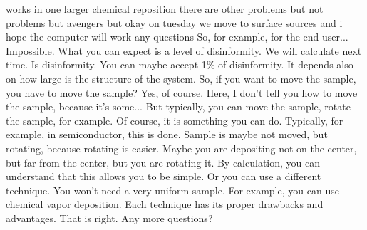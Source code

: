 works in one larger chemical reposition there are other problems but not problems but avengers but okay on tuesday we move to surface sources and i hope the computer will work any questions So, for example, for the end-user... Impossible. What you can expect is a level of disinformity. We will calculate next time. Is disinformity. You can maybe accept 1\% of disinformity. It depends also on how large is the structure of the system. So, if you want to move the sample, you have to move the sample? Yes, of course. Here, I don't tell you how to move the sample, because it's some... But typically, you can move the sample, rotate the sample, for example. Of course, it is something you can do. Typically, for example, in semiconductor, this is done. Sample is maybe not moved, but rotating, because rotating is easier. Maybe you are depositing not on the center, but far from the center, but you are rotating it. By calculation, you can understand that this allows you to be simple. Or you can use a different technique. You won't need a very uniform sample. For example, you can use chemical vapor deposition. Each technique has its proper drawbacks and advantages. That is right. Any more questions?









